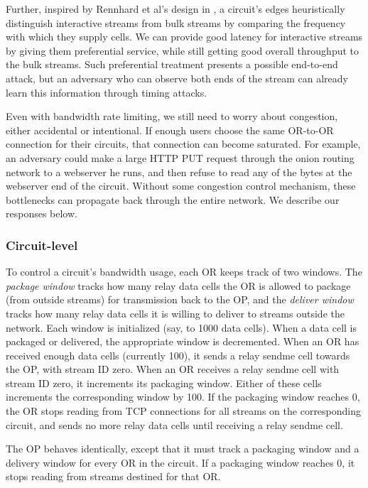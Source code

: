 \documentclass[times,10pt,twocolumn]{article}
\begin{document}
Further, inspired by Rennhard et al's design in \cite{anonnet}, a
circuit's edges heuristically distinguish interactive streams from bulk
streams by comparing the frequency with which they supply cells.  We can
provide good latency for interactive streams by giving them preferential
service, while still getting good overall throughput to the bulk
streams. Such preferential treatment presents a possible end-to-end
attack, but an adversary who can observe both
ends of the stream can already learn this information through timing
attacks.

\label{subsec:congestion}

Even with bandwidth rate limiting, we still need to worry about
congestion, either accidental or intentional. If enough users choose the
same OR-to-OR connection for their circuits, that connection can become
saturated. For example, an adversary could make a large HTTP PUT request
through the onion routing network to a webserver he runs, and then
refuse to read any of the bytes at the webserver end of the
circuit. Without some congestion control mechanism, these bottlenecks
can propagate back through the entire network.  We describe our
responses below.

\subsubsection{Circuit-level}

To control a circuit's bandwidth usage, each OR keeps track of two
windows. The \emph{package window} tracks how many relay data cells the OR is
allowed to package (from outside streams) for transmission back to the OP,
and the \emph{deliver window} tracks how many relay data cells it is willing
to deliver to streams outside the network. Each window is initialized
(say, to 1000 data cells). When a data cell is packaged or delivered,
the appropriate window is decremented. When an OR has received enough
data cells (currently 100), it sends a relay sendme cell towards the OP,
with stream ID zero. When an OR receives a relay sendme cell with stream
ID zero, it increments its packaging window. Either of these cells
increments the corresponding window by 100. If the packaging window
reaches 0, the OR stops reading from TCP connections for all streams
on the corresponding circuit, and sends no more relay data cells until
receiving a relay sendme cell.

The OP behaves identically, except that it must track a packaging window
and a delivery window for every OR in the circuit. If a packaging window
reaches 0, it stops reading from streams destined for that OR.
\end{document}
